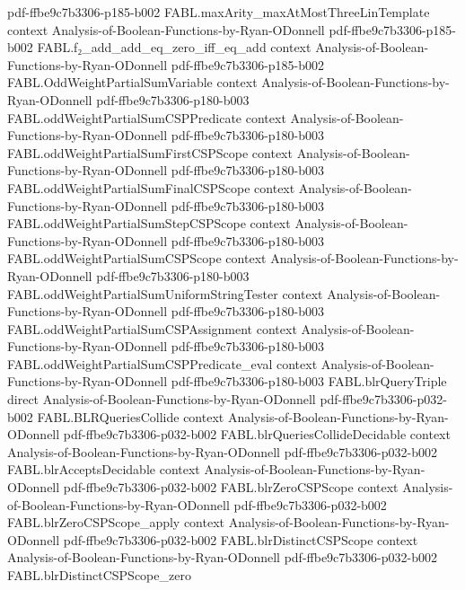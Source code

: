 \begin{theorem}
  {pdf-ffbe9c7b3306-p185-b002}
\proofstep
  {FABL.maxArity_maxAtMostThreeLinTemplate}
  {context}
  {Analysis-of-Boolean-Functions-by-Ryan-ODonnell}
  {pdf-ffbe9c7b3306-p185-b002}
\proofstep
  {FABL.f₂_add_add_eq_zero_iff_eq_add}
  {context}
  {Analysis-of-Boolean-Functions-by-Ryan-ODonnell}
  {pdf-ffbe9c7b3306-p185-b002}
\proofstep
  {FABL.OddWeightPartialSumVariable}
  {context}
  {Analysis-of-Boolean-Functions-by-Ryan-ODonnell}
  {pdf-ffbe9c7b3306-p180-b003}
\proofstep
  {FABL.oddWeightPartialSumCSPPredicate}
  {context}
  {Analysis-of-Boolean-Functions-by-Ryan-ODonnell}
  {pdf-ffbe9c7b3306-p180-b003}
\proofstep
  {FABL.oddWeightPartialSumFirstCSPScope}
  {context}
  {Analysis-of-Boolean-Functions-by-Ryan-ODonnell}
  {pdf-ffbe9c7b3306-p180-b003}
\proofstep
  {FABL.oddWeightPartialSumFinalCSPScope}
  {context}
  {Analysis-of-Boolean-Functions-by-Ryan-ODonnell}
  {pdf-ffbe9c7b3306-p180-b003}
\proofstep
  {FABL.oddWeightPartialSumStepCSPScope}
  {context}
  {Analysis-of-Boolean-Functions-by-Ryan-ODonnell}
  {pdf-ffbe9c7b3306-p180-b003}
\proofstep
  {FABL.oddWeightPartialSumCSPScope}
  {context}
  {Analysis-of-Boolean-Functions-by-Ryan-ODonnell}
  {pdf-ffbe9c7b3306-p180-b003}
\proofstep
  {FABL.oddWeightPartialSumUniformStringTester}
  {context}
  {Analysis-of-Boolean-Functions-by-Ryan-ODonnell}
  {pdf-ffbe9c7b3306-p180-b003}
\proofstep
  {FABL.oddWeightPartialSumCSPAssignment}
  {context}
  {Analysis-of-Boolean-Functions-by-Ryan-ODonnell}
  {pdf-ffbe9c7b3306-p180-b003}
\proofstep
  {FABL.oddWeightPartialSumCSPPredicate_eval}
  {context}
  {Analysis-of-Boolean-Functions-by-Ryan-ODonnell}
  {pdf-ffbe9c7b3306-p180-b003}
\proofstep
  {FABL.blrQueryTriple}
  {direct}
  {Analysis-of-Boolean-Functions-by-Ryan-ODonnell}
  {pdf-ffbe9c7b3306-p032-b002}
\proofstep
  {FABL.BLRQueriesCollide}
  {context}
  {Analysis-of-Boolean-Functions-by-Ryan-ODonnell}
  {pdf-ffbe9c7b3306-p032-b002}
\proofstep
  {FABL.blrQueriesCollideDecidable}
  {context}
  {Analysis-of-Boolean-Functions-by-Ryan-ODonnell}
  {pdf-ffbe9c7b3306-p032-b002}
\proofstep
  {FABL.blrAcceptsDecidable}
  {context}
  {Analysis-of-Boolean-Functions-by-Ryan-ODonnell}
  {pdf-ffbe9c7b3306-p032-b002}
\proofstep
  {FABL.blrZeroCSPScope}
  {context}
  {Analysis-of-Boolean-Functions-by-Ryan-ODonnell}
  {pdf-ffbe9c7b3306-p032-b002}
\proofstep
  {FABL.blrZeroCSPScope_apply}
  {context}
  {Analysis-of-Boolean-Functions-by-Ryan-ODonnell}
  {pdf-ffbe9c7b3306-p032-b002}
\proofstep
  {FABL.blrDistinctCSPScope}
  {context}
  {Analysis-of-Boolean-Functions-by-Ryan-ODonnell}
  {pdf-ffbe9c7b3306-p032-b002}
\proofstep
  {FABL.blrDistinctCSPScope_zero}

\end{theorem}
